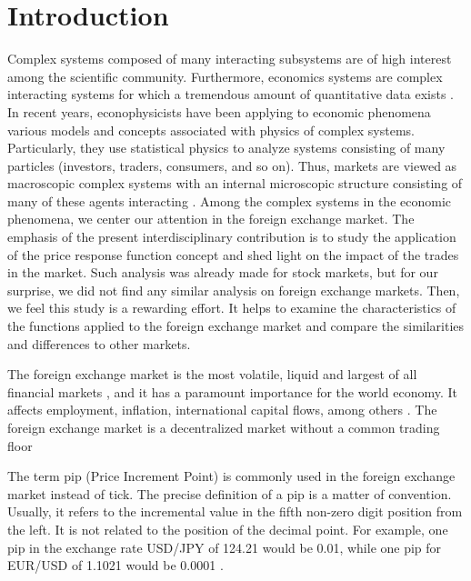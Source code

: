 \section{Introduction}\label{sec:introduction}

Complex systems composed of many interacting subsystems are of high interest
among the scientific community. Furthermore, economics systems are complex
interacting systems for which a tremendous amount of quantitative data exists
\cite{physicists_contribution}. In recent years, econophysicists have been
applying to economic phenomena various models and concepts associated with
physics of complex systems. Particularly, they use statistical physics to
analyze systems consisting of many particles (investors, traders, consumers,
and so on). Thus, markets are viewed as macroscopic complex systems with an
internal microscopic structure consisting of many of these agents interacting
\cite{complex_markets}. Among the complex systems in the economic phenomena,
we center our attention in the foreign exchange market. The emphasis of the
present interdisciplinary contribution is to study the application of the price
response function concept and shed light on the impact of the trades in the
market. Such analysis was already made for stock markets, but for our surprise,
we did not find any similar analysis on foreign exchange markets. Then, we feel
this study is a rewarding effort. It helps to examine the characteristics of
the functions applied to the foreign exchange market and compare the
similarities and differences to other markets.

The foreign exchange market is the most volatile, liquid and largest of all
financial markets
\cite{forex_liquidity,info_forex,forex_market_micro,intraday_forex}, and it has
a paramount importance for the world economy. It affects employment, inflation,
international capital flows, among others \cite{forex_structure}. The foreign
exchange market is a decentralized market without a common trading floor
\cite{teach_spread,forex_structure,info_forex,forex_market_micro}

The term pip (Price Increment Point) is commonly used in the foreign exchange
market instead of tick. The precise definition of a pip is a matter of
convention. Usually, it refers to the incremental value in the fifth non-zero
digit position from the left. It is not related to the position of the decimal
point. For example, one pip in the exchange rate USD/JPY of 124.21 would be
0.01, while one pip for EUR/USD of 1.1021 would be 0.0001
\cite{order_flow_forex,forex_structure,micro_eff,forex_market_micro}.

